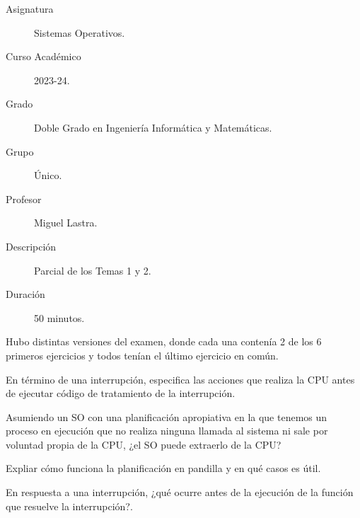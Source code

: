 \documentclass[12pt]{article}
\begin{document}

    
    

    \begin{description}
        \item[Asignatura] Sistemas Operativos.
        \item[Curso Académico] 2023-24.
        \item[Grado] Doble Grado en Ingeniería Informática y Matemáticas.
        \item[Grupo] Único.
        \item[Profesor] Miguel Lastra.
        \item[Descripción] Parcial de los Temas 1 y 2.
        \item[Duración] 50 minutos.
    
    \end{description}
    \newpage
    
    \noindent
    Hubo distintas versiones del examen, donde cada una contenía 2 de los 6 primeros ejercicios y todos tenían el último ejercicio en común.

    \begin{ejercicio}
        En término de una interrupción, especifica las acciones que realiza la CPU antes de ejecutar código de tratamiento de la interrupción.
    \end{ejercicio}

    \begin{ejercicio}
        Asumiendo un SO con una planificación apropiativa en la que tenemos un proceso en ejecución que no realiza ninguna llamada al sistema ni sale por voluntad propia de la CPU, ¿el SO puede extraerlo de la CPU?
    \end{ejercicio}

    \begin{ejercicio}
        Expliar cómo funciona la planificación en pandilla y en qué casos es útil.
    \end{ejercicio}

    \begin{ejercicio}
        En respuesta a una interrupción, ¿qué ocurre antes de la ejecución de la función que resuelve la interrupción?.
    \end{ejercicio}
\end{document}
